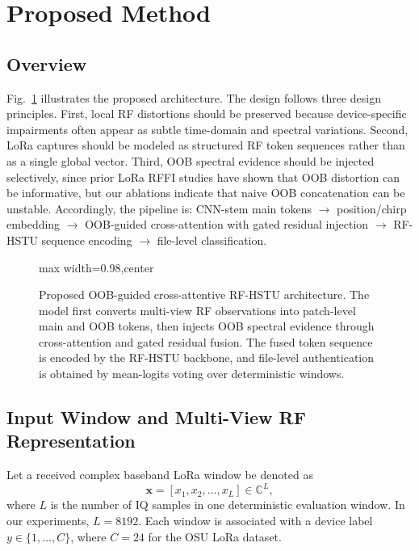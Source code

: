 \section{Proposed Method}
\label{sec:method}

\subsection{Overview}

Fig.~\ref{fig:architecture} illustrates the proposed \model{} architecture. The design follows three design principles.
First, local RF distortions should be preserved because device-specific impairments often appear as subtle time-domain and spectral variations.
Second, LoRa captures should be modeled as structured RF token sequences rather than as a single global vector.
Third, OOB spectral evidence should be injected selectively, since prior LoRa RFFI studies have shown that OOB distortion can be informative, but our ablations indicate that naive OOB concatenation can be unstable.
Accordingly, the pipeline is:
CNN-stem main tokens $\rightarrow$ position/chirp embedding $\rightarrow$ OOB-guided cross-attention with gated residual injection $\rightarrow$ RF-HSTU sequence encoding $\rightarrow$ file-level classification.

\begin{figure}[!t]
    \centering
    \begin{adjustbox}{max width=0.98\textwidth,center}
    
    \end{adjustbox}
    \caption{Proposed OOB-guided cross-attentive RF-HSTU architecture. The model first converts multi-view RF observations into patch-level main and OOB tokens, then injects OOB spectral evidence through cross-attention and gated residual fusion. The fused token sequence is encoded by the RF-HSTU backbone, and file-level authentication is obtained by mean-logits voting over deterministic windows.}
    \label{fig:architecture}
\end{figure}

\subsection{Input Window and Multi-View RF Representation}

Let a received complex baseband LoRa window be denoted as
\begin{equation}
    \mathbf{x} = [x_1, x_2, \ldots, x_L] \in \mathbb{C}^{L},
\end{equation}
where $L$ is the number of IQ samples in one deterministic evaluation window. In our experiments, $L=8192$. Each window is associated with a device label $y \in \{1,\ldots,C\}$, where $C=24$ for the OSU LoRa dataset.


